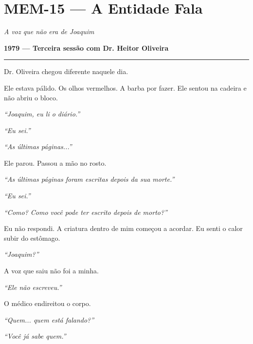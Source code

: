 \section*{\textbf{MEM-15} --- A Entidade Fala}

\noindent \textit{A voz que não era de Joaquim}

\noindent \textbf{1979 --- Terceira sessão com Dr. Heitor Oliveira}

\vspace{0.5em}\noindent\rule{\textwidth}{0.5pt}\vspace{0.5em}

\noindent Dr. Oliveira chegou diferente naquele dia.

\noindent Ele estava pálido. Os olhos vermelhos. A barba por fazer. Ele sentou na cadeira e não abriu o bloco.

\noindent \textit{\textquotedblleft{}Joaquim, eu li o diário.\textquotedblright{}}

\noindent \textit{\textquotedblleft{}Eu sei.\textquotedblright{}}

\noindent \textit{\textquotedblleft{}As últimas páginas...\textquotedblright{}}

\noindent Ele parou. Passou a mão no rosto.

\noindent \textit{\textquotedblleft{}As últimas páginas foram escritas depois da sua morte.\textquotedblright{}}

\noindent \textit{\textquotedblleft{}Eu sei.\textquotedblright{}}

\noindent \textit{\textquotedblleft{}Como? Como você pode ter escrito depois de morto?\textquotedblright{}}

\noindent Eu não respondi. A criatura dentro de mim começou a acordar. Eu senti o calor subir do estômago.

\noindent \textit{\textquotedblleft{}Joaquim?\textquotedblright{}}

\noindent A voz que saiu não foi a minha.

\noindent \textit{\textquotedblleft{}Ele não escreveu.\textquotedblright{}}

\noindent O médico endireitou o corpo.

\noindent \textit{\textquotedblleft{}Quem... quem está falando?\textquotedblright{}}

\noindent \textit{\textquotedblleft{}Você já sabe quem.\textquotedblright{}}

